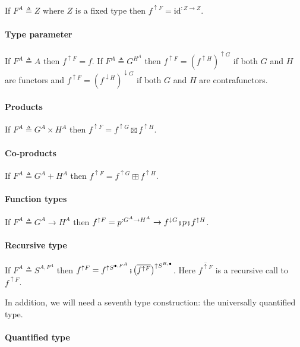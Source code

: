 If $F^{A}\triangleq Z$ where $Z$ is a fixed type then $f^{\uparrow F}=\text{id}^{:Z\rightarrow Z}$.

\paragraph{Type parameter}

If $F^{A}\triangleq A$ then $f^{\uparrow F}=f$. If $F^{A}\triangleq G^{H^{A}}$
then $f^{\uparrow F}=(f^{\uparrow H})^{\uparrow G}$ if both $G$
and $H$ are functors and $f^{\uparrow F}=(f^{\downarrow H})^{\downarrow G}$
if both $G$ and $H$ are contrafunctors.

\paragraph{Products}

If $F^{A}\triangleq G^{A}\times H^{A}$ then $f^{\uparrow F}=f^{\uparrow G}\boxtimes f^{\uparrow H}$.

\paragraph{Co-products}

If $F^{A}\triangleq G^{A}+H^{A}$ then $f^{\uparrow F}=f^{\uparrow G}\boxplus f^{\uparrow H}$.

\paragraph{Function types}

If $F^{A}\triangleq G^{A}\rightarrow H^{A}$ then $f^{\uparrow F}=p^{:G^{A}\rightarrow H^{A}}\rightarrow f^{\downarrow G}\bef p\bef f^{\uparrow H}$.

\paragraph{Recursive type}

If $F^{A}\triangleq S^{A,F^{A}}$ then $f^{\uparrow F}=f^{\uparrow S^{\bullet,F^{A}}}\bef\big(\overline{f^{\uparrow F}}\big)^{\uparrow S^{B,\bullet}}$.
Here $\overline{f^{\uparrow F}}$ is a recursive call to $f^{\uparrow F}$.

In addition, we will need a seventh type construction: the universally
quantified type.

\paragraph{Quantified type}

